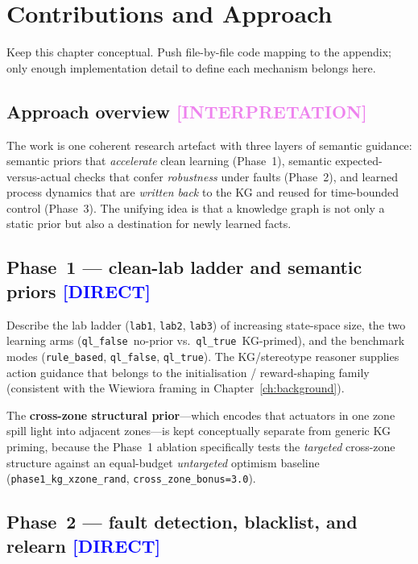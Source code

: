 \documentclass[12pt, a4paper, oneside]{memoir}
\newcommand{\evDirect}{\textcolor{blue}{[DIRECT]}}
\newcommand{\evInterp}{\textcolor{violet}{[INTERPRETATION]}}
\newcommand{\qlT}{\texttt{ql\_true}}
\newcommand{\qlF}{\texttt{ql\_false}}
\begin{document}
\chapter{Contributions and Approach}
\label{ch:contributions}

Keep this chapter conceptual.  Push file-by-file code mapping to the
appendix; only enough implementation detail to define each mechanism belongs
here.

\section{Approach overview \evInterp}
\label{sec:approach-overview}

The work is one coherent research artefact with three layers of semantic
guidance: semantic priors that \emph{accelerate} clean learning (Phase~1),
semantic expected-versus-actual checks that confer \emph{robustness} under
faults (Phase~2), and learned process dynamics that are \emph{written back}
to the KG and reused for time-bounded control (Phase~3).  The unifying idea
is that a knowledge graph is not only a static prior but also a destination
for newly learned facts.

\section{Phase~1 --- clean-lab ladder and semantic priors \evDirect}
\label{sec:approach-phase1}

Describe the lab ladder (\texttt{lab1}, \texttt{lab2}, \texttt{lab3}) of
increasing state-space size, the two learning arms (\qlF\ no-prior
vs.\ \qlT\ KG-primed), and the benchmark modes (\texttt{rule\_based},
\qlF, \qlT).  The KG/stereotype reasoner supplies action guidance that
belongs to the initialisation / reward-shaping family (consistent with the
Wiewiora framing in Chapter~\ref{ch:background}).

The \textbf{cross-zone structural prior}---which encodes that actuators in
one zone spill light into adjacent zones---is kept conceptually separate from
generic KG priming, because the Phase~1 ablation specifically tests the
\emph{targeted} cross-zone structure against an equal-budget \emph{untargeted}
optimism baseline (\texttt{phase1\_kg\_xzone\_rand},
\texttt{cross\_zone\_bonus=3.0}).

\section{Phase~2 --- fault detection, blacklist, and relearn \evDirect}
\label{sec:approach-phase2}
\end{document}
